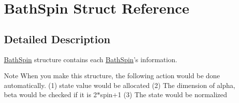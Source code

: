 \hypertarget{structBathSpin}{\section{Bath\-Spin Struct Reference}
\label{structBathSpin}
}


\subsection{Detailed Description}
\hyperlink{structBathSpin}{Bath\-Spin} structure contains each \hyperlink{structBathSpin}{Bath\-Spin}'s information. 

\begin{DoxyNote}{Note}
When you make this structure, the following action would be done automatically. (1) state value would be allocated (2) The dimension of alpha, beta would be checked if it is 2$\ast$spin+1 (3) The state would be normalized 
\end{DoxyNote}
